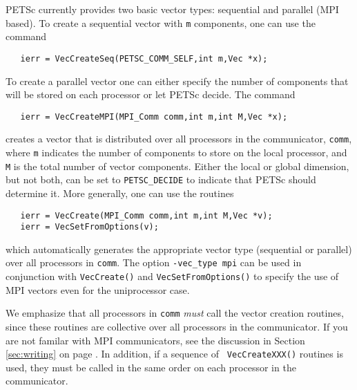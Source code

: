 PETSc currently provides two basic vector types: sequential and parallel
(MPI based). To create a sequential vector with {\tt m} components,
one can
use the command  
\begin{verbatim}
   ierr = VecCreateSeq(PETSC_COMM_SELF,int m,Vec *x);
\end{verbatim}
To create a parallel vector one can either specify the number of 
components that will be stored on each processor or let PETSc decide. 
The command 
\begin{verbatim}
   ierr = VecCreateMPI(MPI_Comm comm,int m,int M,Vec *x);
\end{verbatim}
creates a vector that is distributed over all processors in the communicator,
{\tt comm}, where {\tt m} indicates the number 
of components to store on the local processor, and {\tt M} is the 
total number of vector components.  Either the local or global 
dimension, but not both, can be set to {\tt PETSC\_DECIDE} to 
 indicate that PETSc should determine it.
More generally, one can use the routines  
\begin{verbatim}
   ierr = VecCreate(MPI_Comm comm,int m,int M,Vec *v);
   ierr = VecSetFromOptions(v);
\end{verbatim}
which automatically generates the appropriate vector type 
(sequential or parallel) over all processors in {\tt comm}.
The option {\tt -vec\_type mpi} can be used in conjunction with 
{\tt VecCreate()} and {\tt VecSetFromOptions()} to specify the use of MPI 
vectors even for the uniprocessor case.

We emphasize that all processors in {\tt comm} {\em must} call the
vector creation routines, since these routines are collective over all
processors in the communicator. If you are not familar with MPI communicators,
see the discussion in Section \ref{sec:writing} on page \pageref{sec:writing}. 
In addition, if a sequence of {\tt
VecCreateXXX()} routines is used, they must be called in the same
order on each processor in the communicator.

